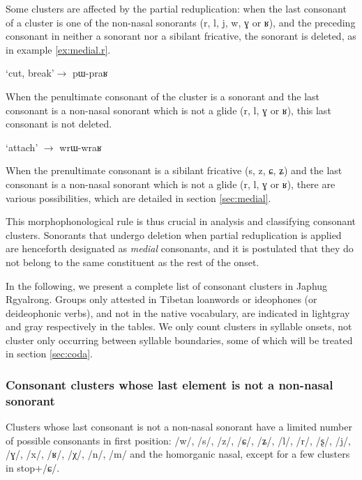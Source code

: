 \documentclass[oldfontcommands,oneside,a4paper,11pt]{article}
\newcommand{\ipa}[1]{{\phon #1}} %
\begin{document}
Some clusters are affected by the partial reduplication:   when the last consonant  of a cluster is one of the non-nasal sonorants (\ipa{r}, \ipa{l}, \ipa{j}, \ipa{w}, \ipa{ɣ} or \ipa{ʁ}), and the preceding consonant in neither a sonorant nor a sibilant fricative, the sonorant is deleted, as in example \ref{ex:medial.r}. 
 
 \begin{exe}
\ex \label{ex:medial.r}
\glt \ipa{praʁ} `cut, break'$\rightarrow$ \ipa{pɯ-praʁ}
\end{exe}

When the penultimate consonant of the cluster is a sonorant   and the last consonant is a non-nasal sonorant which is not a glide (\ipa{r}, \ipa{l}, \ipa{ɣ} or \ipa{ʁ}), this last consonant  is not deleted. 

 \begin{exe}
\ex  \label{ex:initial.r}
\glt \ipa{wraʁ} `attach' $\rightarrow$ \ipa{wrɯ-wraʁ}
\end{exe}
  
When the prenultimate consonant is a sibilant fricative   (\ipa{s}, \ipa{z}, \ipa{ɕ}, \ipa{ʑ}) and the last consonant is a non-nasal sonorant which is not a glide (\ipa{r}, \ipa{l}, \ipa{ɣ} or \ipa{ʁ}), there are various possibilities, which are detailed in section \ref{sec:medial}.

This morphophonological rule is thus crucial in analysis and classifying consonant clusters. Sonorants that undergo deletion when partial reduplication is applied are henceforth designated as \textit{medial} consonants, and it is postulated that they do not belong to the same constituent as the rest of the onset.

In the following, we present a complete list of consonant clusters in Japhug Rgyalrong. Groups only attested in Tibetan loanwords or ideophones (or deideophonic verbs), and not in the native vocabulary, are indicated in lightgray and gray respectively in the tables. We only count clusters in syllable onsets, not cluster only occurring between syllable boundaries, some of which will be treated in section \ref{sec:coda}.
  
  
  \subsubsection{Consonant clusters whose last element is not a non-nasal sonorant}  
Clusters whose last consonant is not a non-nasal sonorant have a limited number of possible consonants in first position: /w/, /s/, /z/, /ɕ/, /ʑ/, /l/, /r/, /ʂ/, /j/, /ɣ/, /x/, /ʁ/, /χ/, /n/, /m/ and the homorganic nasal, except for a few clusters in stop+/ɕ/.
\end{document}
